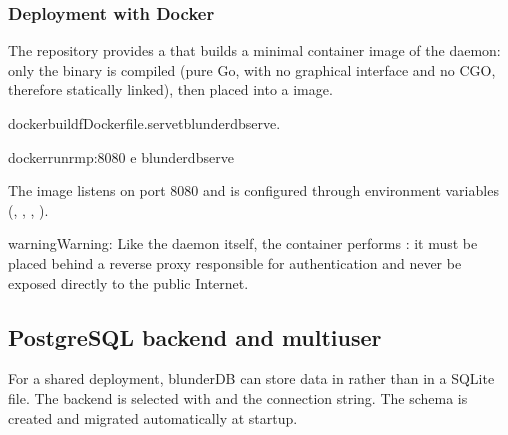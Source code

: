 \documentclass[letterpaper,10pt,english]{sphinxmanual}
\begin{document}
\subsubsection{Deployment with Docker}
\label{\detokenize{mode_headless:deploiement-avec-docker}}\label{\detokenize{mode_headless:headless-docker}}
\sphinxAtStartPar
The repository provides a  that builds a minimal container image of the daemon: only the  binary is compiled (pure Go, with no graphical interface and no CGO, therefore statically linked), then placed into a  image.

\begin{sphinxVerbatim}[commandchars=\\\{\}]
dockerbuild\PYGZhy{}fDockerfile.serve\PYGZhy{}tblunderdb\PYGZhy{}serve.

dockerrun\PYGZhy{}\PYGZhy{}rm\PYGZhy{}p:8080
\PYGZhy{}e
blunderdb\PYGZhy{}serve
\end{sphinxVerbatim}

\sphinxAtStartPar
The image listens on port 8080 and is configured through environment variables (, , , ).

\begin{sphinxadmonition}{warning}{Warning:}
\sphinxAtStartPar
Like the daemon itself, the container performs : it must be placed behind a reverse proxy responsible for authentication and never be exposed directly to the public Internet.
\end{sphinxadmonition}


\subsection{PostgreSQL backend and multi\sphinxhyphen{}user}
\label{\detokenize{mode_headless:backend-postgresql-et-multi-utilisateurs}}\label{\detokenize{mode_headless:headless-postgres}}
\sphinxAtStartPar
For a shared deployment, blunderDB can store data in  rather than in a SQLite file. The backend is selected with  and the  connection string. The schema is created and migrated automatically at startup.
\end{document}
